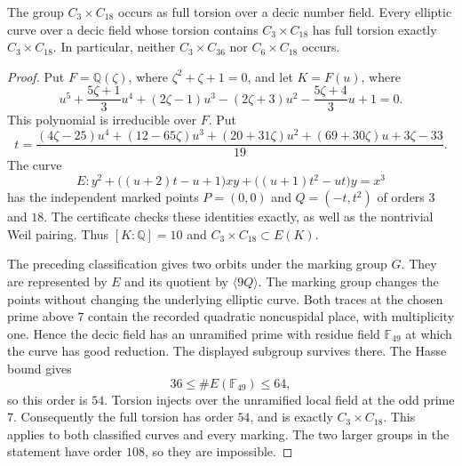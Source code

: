 \begin{corollary}\label{cor:decic318-realization-and-frontier}
The group $C_3\times C_{18}$ occurs as full torsion over a decic
number field. Every elliptic curve over a decic field whose torsion
contains $C_3\times C_{18}$ has full torsion exactly
$C_3\times C_{18}$. In particular, neither $C_3\times C_{36}$
nor $C_6\times C_{18}$ occurs.
\end{corollary}
\begin{proof}
Put $F=\mathbb Q(\zeta)$, where $\zeta^2+\zeta+1=0$, and let
$K=F(u)$, where
\[
 u^5+\frac{5\zeta+1}{3}u^4+(2\zeta-1)u^3
 -(2\zeta+3)u^2-\frac{5\zeta+4}{3}u+1=0.
\]
This polynomial is irreducible over $F$. Put
\[
 t=\frac{(4\zeta-25)u^4+(12-65\zeta)u^3+(20+31\zeta)u^2
              +(69+30\zeta)u+3\zeta-33}{19}.
\]
The curve
\[
 E:y^2+\bigl((u+2)t-u+1\bigr)xy
          +\bigl((u+1)t^2-ut\bigr)y=x^3
\]
has the independent marked points $P=(0,0)$ and $Q=(-t,t^2)$
of orders $3$ and $18$. The certificate checks these identities
exactly, as well as the nontrivial Weil pairing. Thus
$[K:\mathbb Q]=10$ and $C_3\times C_{18}\subset E(K)$.

The preceding classification gives two orbits under the marking
group $G$. They are represented by $E$ and its quotient by
$\langle9Q\rangle$. The marking group changes the points without
changing the underlying elliptic curve. Both traces at the chosen
prime above $7$ contain the recorded quadratic noncuspidal place,
with multiplicity one. Hence the decic field has an unramified
prime with residue field $\mathbb F_{49}$ at which the curve has
good reduction. The displayed subgroup survives there. The Hasse
bound gives
\[
                 36\leq\#E(\mathbb F_{49})\leq64,
\]
so this order is $54$. Torsion injects over the unramified local
field at the odd prime $7$. Consequently the full torsion has
order $54$, and is exactly $C_3\times C_{18}$.
This applies to both classified curves and every marking.
The two larger groups in the statement have order $108$, so they
are impossible.
\end{proof}
